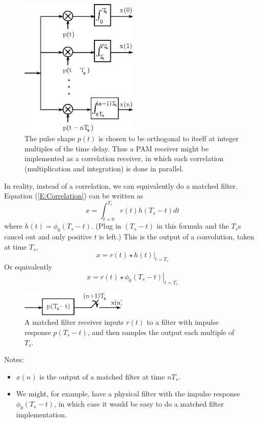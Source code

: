   \begin{figure}[htbp]
    \centerline{\includegraphics[width=0.5\textwidth]{../images/time_delay_correlation_receiver.eps} }
    \caption{The pulse shape $p(t)$ is chosen to be orthogonal to itself at integer multiples of the time delay.  Thus a PAM receiver might be implemented as a correlation receiver, in which each correlation (multiplication and integration) is done in parallel.}
    \label{F:multiple_correlation}
  \end{figure}
  
In reality, instead of a correlation, we can equivalently do a matched filter.  Equation (\ref{E:Correlation}) can be written as
\[
 x = \int_{t=0}^{T_s} r(t) h(T_s - t) dt
\]
where $h(t) = \phi_0(T_s-t)$.  (Plug in $(T_s-t)$ in this formula and
the $T_s$s cancel out and only positive $t$ is left.)  This is the
output of a convolution, taken at time $T_s$,
\[
 x =  \left. r(t) \star h(t) \right|_{t=T_s}
\]
Or equivalently
\[
 x =  \left. r(t) \star \phi_0(T_s-t) \right|_{t=T_s}
\]

  \begin{figure}[htbp]
    \centerline{\includegraphics[width=0.45\textwidth]{../images/matched_filter_receiver.eps} }
    \caption{A matched filter receiver inputs $r(t)$ to a filter with impulse response $p(T_s-t)$, and then samples the output each multiple of $T_s$.}
    \label{F:matched_filter_rx}
  \end{figure}

Notes:
\begin{itemize}
  \item $x(n)$ is the output of a matched filter at time $nT_s$.
  \item We might, for example, have a physical filter with the impulse
    response $\phi_0(T_s-t)$, in which case it would be easy to do a matched filter
    implementation.
\end{itemize}


